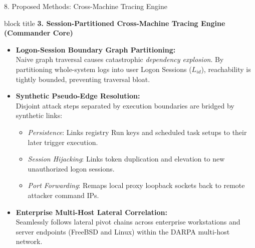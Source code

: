 \documentclass[aspectratio=169,10pt]{beamer}
\begin{document}
\begin{frame}{8. Proposed Methods: Cross-Machine Tracing Engine}
\vspace{0.15em}
\begin{beamercolorbox}[rounded=true,shadow=false,sep=0.38em,wd=\textwidth]{block title}
\textbf{\scriptsize 3. Session-Partitioned Cross-Machine Tracing Engine (Commander Core)}
\end{beamercolorbox}
\vspace{0.15em}
{\fontsize{7.4pt}{10.6pt}\selectfont
\begin{itemize}\itemsep0.25em
  \item \textbf{Logon-Session Boundary Graph Partitioning:}\\
  Naive graph traversal causes catastrophic \textit{dependency explosion}. By partitioning whole-system logs into user Logon Sessions ($L_{id}$), reachability is tightly bounded, preventing traversal bloat.
  \item \textbf{Synthetic Pseudo-Edge Resolution:}\\
  Disjoint attack steps separated by execution boundaries are bridged by synthetic links:
  \begin{itemize}\itemsep0.12em
    \item \textit{Persistence}: Links registry Run keys and scheduled task setups to their later trigger execution.
    \item \textit{Session Hijacking}: Links token duplication and elevation to new unauthorized logon sessions.
    \item \textit{Port Forwarding}: Remaps local proxy loopback sockets back to remote attacker command IPs.
  \end{itemize}
  \item \textbf{Enterprise Multi-Host Lateral Correlation:}\\
  Seamlessly follows lateral pivot chains across enterprise workstations and server endpoints (FreeBSD and Linux) within the DARPA multi-host network.
\end{itemize}
}
\end{frame}
\end{document}
